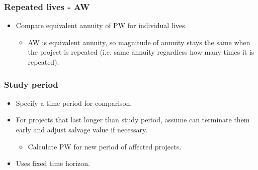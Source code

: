 \begin{example}
\end{example}

\subsubsection{Repeated lives - AW}
\begin{definition}
    \begin{itemize}
        \item Compare equivalent annuity of PW for individual lives.
        \begin{itemize}
            \item AW is equivalent annuity, so magnitude of annuity stays the same when the project is repeated (i.e. same annuity regardless how many times it is repeated).
        \end{itemize}
    \end{itemize}
\end{definition}

\begin{example}
\end{example}
    
\subsubsection{Study period}
\begin{definition}
    \begin{itemize}
        \item Specify a time period for comparison. 
        \item For projects that last longer than study period, assume can terminate them early and adjust salvage value if necessary.
        \begin{itemize}
            \item Calculate PW for new period of affected projects. 
        \end{itemize}
        \item Uses fixed time horizon. 
    \end{itemize}
\end{definition}

\begin{example}
\end{example}

